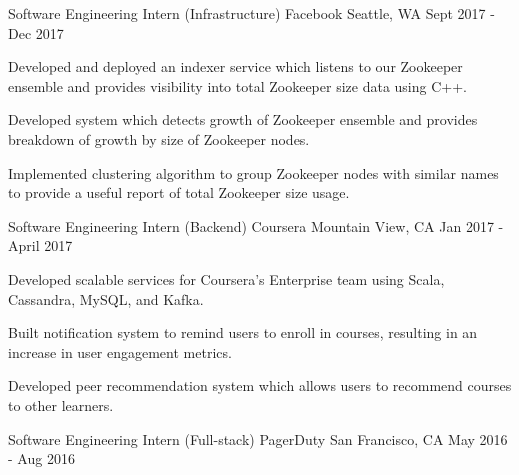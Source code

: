 

\begin{cventries}
  \cventry
  {Software Engineering Intern (Infrastructure)} %
    {Facebook} %
    {Seattle, WA} %
    {Sept 2017 - Dec 2017} %
    {
      \begin{cvitems} %
      \item {Developed and deployed an indexer service which listens to our Zookeeper ensemble and provides visibility into total Zookeeper size data using C++.}
      \item {Developed system which detects growth of Zookeeper ensemble and provides breakdown of growth by size of Zookeeper nodes.}
      \item {Implemented clustering algorithm to group Zookeeper nodes with similar names to provide a useful report of total Zookeeper size usage.}
      \end{cvitems}
    }
  \cventry
  {Software Engineering Intern (Backend)} %
    {Coursera} %
    {Mountain View, CA} %
    {Jan 2017 - April 2017} %
    {
      \begin{cvitems} %
      \item {Developed scalable services for Coursera's Enterprise team using Scala, Cassandra, MySQL, and Kafka.}
      \item {Built notification system to remind users to enroll in courses, resulting in an increase in user engagement metrics.}
      \item {Developed peer recommendation system which allows users to recommend courses to other learners.}
      \end{cvitems}
    }
  \cventry
  {Software Engineering Intern (Full-stack)} %
    {PagerDuty} %
    {San Francisco, CA} %
    {May 2016 - Aug 2016} %
    {
      \begin{cvitems} %

\end{cvitems}}
\end{cventries}
